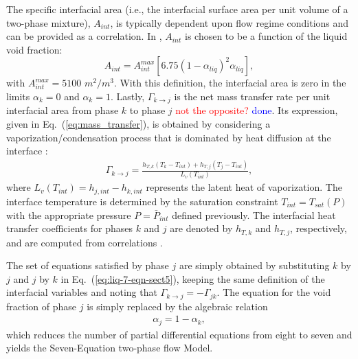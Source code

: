 \documentclass[preprint,10pt]{elsarticle}
\newcommand{\Gammakj}{\Gamma_{k \to j}}
\newcommand{\eqt}[1]{Eq.~(\ref{#1})}                     %
\newcommand{\tcr}[1]{\textcolor{red}{#1}}
\newcommand{\tcb}[1]{\textcolor{blue}{#1}}
\begin{document}
%
The specific interfacial area (i.e., the interfacial surface area per unit
volume of a two-phase mixture), $A_{int}$, is typically dependent upon flow regime conditions and can be provided as a correlation. In \cite{SEM}, $A_{int}$ is chosen to be a function of the liquid void fraction:
%
\begin{equation}\label{eq:Aint-sect4}
A_{int} = A_{int}^{max} \left[ 6.75 \left(1-\alpha_{liq} \right)^2 \alpha_{liq} \right],
\end{equation}
% 
with $A_{int}^{max} = 5100$ $m^2 / m^3$. With this definition, the interfacial area is zero in the limits $\alpha_{k} = 0$ and $\alpha_{k} = 1$. Lastly, $\Gammakj$ is the net mass transfer rate per unit interfacial area from phase $k$ to phase $j$ \tcr{not the opposite?} \tcb{done}. Its expression, given in \eqt{eq:mass_transfer}, is obtained by considering a vaporization/condensation process that is dominated by heat diffusion at the interface \cite{SEM, BerryMarco_2014}:
%
\begin{align} \label{eq:mass_transfer}
  \Gammakj = \frac{h_{T,  k} \left( T_{k} - T_{int} \right) + h_{T,  j} \left( T_{j} - T_{int} \right)}{L_v \left( T_{int} \right)} ,
\end{align}
%
where $L_v \left( T_{int} \right) = h_{j,  int} - h_{k,  int}$
represents the latent heat of vaporization.  The interface
temperature is determined by the saturation constraint
$T_{int}=T_{sat}(P)$ with the appropriate pressure $P=\bar{P}_{int}$
defined previously. The interfacial heat transfer coefficients for phases $k$ and $j$ are denoted by $h_{T,  k}$ and $h_{T,  j}$, respectively, and are computed from correlations \cite{SEM}. 

The set of equations satisfied by phase $j$ are simply obtained by substituting $k$ by $j$ and $j$ by $k$ in \eqt{eq:liq-7-eqn-sect5}, keeping the same definition of the interfacial variables and noting that $\Gammakj = - \Gamma_{jk}$. The equation for the void fraction of phase $j$ is simply replaced by the algebraic relation
%
\begin{align}
 \alpha_{j}= 1 - \alpha_{k}, \nonumber
\end{align}
%
which reduces the number of partial differential equations from eight to seven and yields the Seven-Equation two-phase flow Model. 
\end{document}
